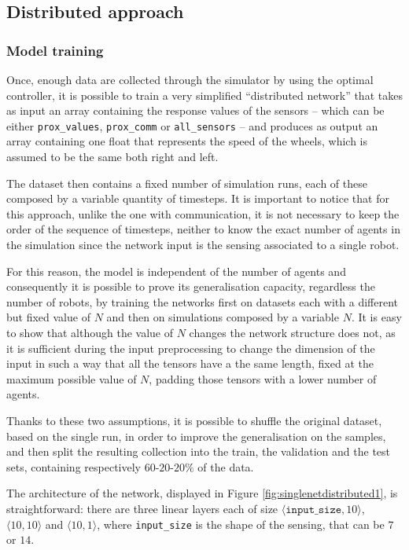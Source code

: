 \subsection{Distributed approach}
\label{subsec:ex1distr}

\subsubsection{Model training}
\label{subsubsec:learneddist}

Once, enough data are collected through the simulator by using the optimal 
controller, it is possible to train a very simplified ``distributed network'' 
that takes as input an array containing the response values of the sensors – 
which can be either \texttt{prox\_values}, \texttt{prox\_comm} or 
\texttt{all\_sensors} – and produces as output an array containing one float 
that represents the speed of the wheels, which is assumed to be the same 
both right and left.

The dataset then contains a fixed number of simulation runs, each of these 
composed by a variable quantity of timesteps. It is important to notice that 
for this approach, unlike the one with communication, it is not necessary to 
keep the order of the sequence of timesteps, neither to know the exact 
number of agents in the simulation since the network input is the sensing 
associated to a single robot.

For this reason, the model is independent of the number of agents and 
consequently it is possible to prove its generalisation capacity, regardless 
the number of robots, by training the networks first on datasets each with a 
different but fixed value of $N$ and then on simulations composed by a 
variable $N$.
It is easy to show that although the value of $N$ changes the network 
structure does not, as it is sufficient during the input preprocessing to 
change the dimension of the input in such a way that all the tensors have a 
the same length, fixed at the maximum possible value of $N$, padding 
those tensors with a lower number of agents.

Thanks to these two assumptions, it is possible to shuffle the original 
dataset, based on the single run, in order to improve the generalisation on 
the samples, and then split the resulting collection into the train, the 
validation and the test sets, containing respectively $60$-$20$-$20\%$ of 
the data. 

The architecture of the network, displayed in Figure 
\ref{fig:singlenetdistributed1}, is straightforward: there are three linear 
layers each of size $\langle\mathtt{input\_size}, 10\rangle$,  $\langle 10, 
10\rangle$ and $\langle 10, 1\rangle$, where \texttt{input\_size} is the 
shape of the sensing, that can be $7$ or $14$.

